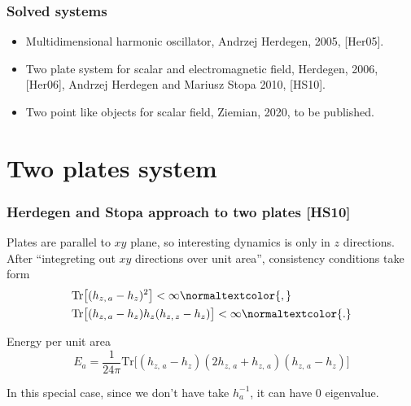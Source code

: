 \documentclass[10pt,t]{beamer}  %
\begin{document}
\begin{frame}
  \frametitle{Solved systems}


  \begin{itemize}
  \item Multidimensional harmonic oscillator, Andrzej Herdegen, 2005,
    [Her05].

  \item Two plate system for scalar and electromagnetic field,
    Herdegen, 2006, [Her06], Andrzej Herdegen and Mariusz Stopa 2010,
    [HS10].

  \item Two point like objects for scalar field, Ziemian, 2020, to be
    published.

  \end{itemize}

\end{frame}










\section{Two plates system}



\begin{frame}
  \frametitle{Herdegen and Stopa approach to two plates [HS10]}


  Plates are parallel to $xy$ plane, so interesting dynamics is only
  in $z$ directions. After ``integreting out $xy$ directions over unit
  area'', consistency conditions take form
  \begin{align}
    &\textrm{Tr}\big[ ( h_{ z,\, a } - h_{ z } )^{ 2 } \big]
      < \infty\normaltextcolor{,} \\
    &\textrm{Tr}\big[ ( h_{ z,\, a } - h_{ z } ) h_{ z } ( h_{ z,\, z }
      - h_{ z } ) \big] < \infty\normaltextcolor{.}
  \end{align}

  Energy per unit area
  \begin{equation}
    \label{eq:16}
    E_{ a }
    =
    \frac{ 1 }{ 24 \pi }
    \textrm{Tr}\big[ ( h_{ z,\, a } - h_{ z } )
    ( 2 h_{ z,\, a } + h_{ z,\, a } ) ( h_{ z,\, a } - h_{ z } ) \big]
  \end{equation}

  In this special case, since we don't have take $h_{ a }^{ -1 }$, it
  can have $0$ eigenvalue.

\end{frame}
\end{document}
